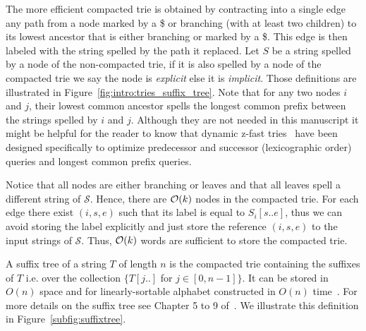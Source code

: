 The more efficient compacted trie is obtained by contracting  into a single edge any path from a node marked by a \$ or branching (with at least two children) to its lowest ancestor that is either branching or marked by a \$.
This edge is then labeled with the string spelled by the path it replaced.
Let $S$ be a string spelled by a node of the non-compacted trie, if it is also spelled by a node of the compacted trie we say the node is \emph{explicit} else it is \emph{implicit}. Those definitions are illustrated in Figure~\ref{fig:intro:tries_suffix_tree}. Note that for any two nodes $i$ and $j$, their lowest common ancestor spells the longest common prefix between the strings spelled by $i$ and $j$.
Although they are not needed in this manuscript it might be helpful for the reader to know that dynamic z-fast tries~\cite{belazzougui2010dynamic} have been designed specifically to optimize predecessor and successor (lexicographic order) queries and longest common prefix queries.

Notice that all nodes are either branching or leaves and that all leaves spell a different string of $\mathcal{S}$. 
Hence, there are $\mathcal{O}(k)$ nodes in the compacted trie.
For each edge there exist $(i,s,e)$ such that its label is equal to $S_i[s .. e]$, thus we can avoid storing the label explicitly and just store the reference $(i,s,e)$ to the input strings of $\mathcal{S}$.
Thus, $\mathcal{O}(k)$ words are sufficient to store the compacted trie.
%


A suffix tree of a string $T$ of length $n$ is the compacted trie containing the suffixes of $T$ i.e. over the collection $\{T[j..]$ for $ j \in [0,n-1] \}$. It can be stored in $O(n)$ space and for linearly-sortable alphabet constructed in $O(n)$ time~\cite{Farach1997}. For more details on the suffix tree see Chapter 5 to 9 of~\cite{Gusfield1997}. We illustrate this definition in Figure~\ref{subfig:suffixtree}.


